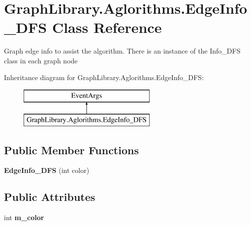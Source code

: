 \hypertarget{class_graph_library_1_1_aglorithms_1_1_edge_info___d_f_s}{}\section{Graph\+Library.\+Aglorithms.\+Edge\+Info\+\_\+\+D\+F\+S Class Reference}
\label{class_graph_library_1_1_aglorithms_1_1_edge_info___d_f_s}


Graph edge info to assist the algorithm. There is an instance of the Info\+\_\+\+D\+F\+S class in each graph node  


Inheritance diagram for Graph\+Library.\+Aglorithms.\+Edge\+Info\+\_\+\+D\+F\+S\+:\begin{figure}[H]
\begin{center}
\leavevmode
\includegraphics[height=2.000000cm]{class_graph_library_1_1_aglorithms_1_1_edge_info___d_f_s}
\end{center}
\end{figure}
\subsection*{Public Member Functions}
\begin{DoxyCompactItemize}
\item 
\hypertarget{class_graph_library_1_1_aglorithms_1_1_edge_info___d_f_s_a144cfb255ee900e143dfe729f946da8a}{}{\bfseries Edge\+Info\+\_\+\+D\+F\+S} (int color)\label{class_graph_library_1_1_aglorithms_1_1_edge_info___d_f_s_a144cfb255ee900e143dfe729f946da8a}

\end{DoxyCompactItemize}
\subsection*{Public Attributes}
\begin{DoxyCompactItemize}
\item 
\hypertarget{class_graph_library_1_1_aglorithms_1_1_edge_info___d_f_s_ad47e54c12b44b0ef0a34790139074389}{}int {\bfseries m\+\_\+color}\label{class_graph_library_1_1_aglorithms_1_1_edge_info___d_f_s_ad47e54c12b44b0ef0a34790139074389}

\end{DoxyCompactItemize}


